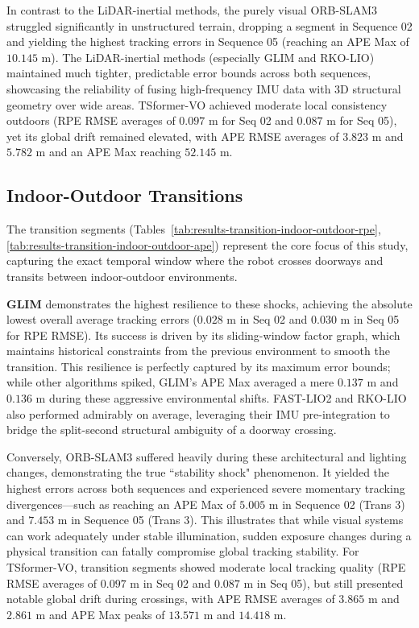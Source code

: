 \documentclass[pdflatex,sn-mathphys-num]{sn-jnl}
\theoremstyle{thmstyleone}%
\theoremstyle{thmstyletwo}%
\theoremstyle{thmstylethree}%
\begin{document}
In contrast to the LiDAR-inertial methods, the purely visual ORB-SLAM3 struggled significantly in unstructured terrain, dropping a segment in Sequence 02 and yielding the highest tracking errors in Sequence 05 (reaching an APE Max of $10.145$ m). The LiDAR-inertial methods (especially GLIM and RKO-LIO) maintained much tighter, predictable error bounds across both sequences, showcasing the reliability of fusing high-frequency IMU data with 3D structural geometry over wide areas. TSformer-VO achieved moderate local consistency outdoors (RPE RMSE averages of $0.097$ m for Seq 02 and $0.087$ m for Seq 05), yet its global drift remained elevated, with APE RMSE averages of $3.823$ m and $5.782$ m and an APE Max reaching $52.145$ m.

\subsection{Indoor-Outdoor Transitions}
The transition segments (Tables~\ref{tab:results-transition-indoor-outdoor-rpe}, \ref{tab:results-transition-indoor-outdoor-ape}) represent the core focus of this study, capturing the exact temporal window where the robot crosses doorways and transits between indoor-outdoor environments. 


\textbf{GLIM} demonstrates the highest resilience to these shocks, achieving the absolute lowest overall average tracking errors ($0.028$ m in Seq 02 and $0.030$ m in Seq 05 for RPE RMSE). Its success is driven by its sliding-window factor graph, which maintains historical constraints from the previous environment to smooth the transition. This resilience is perfectly captured by its maximum error bounds; while other algorithms spiked, GLIM's APE Max averaged a mere $0.137$ m and $0.136$ m during these aggressive environmental shifts. FAST-LIO2 and RKO-LIO also performed admirably on average, leveraging their IMU pre-integration to bridge the split-second structural ambiguity of a doorway crossing.

Conversely, ORB-SLAM3 suffered heavily during these architectural and lighting changes, demonstrating the true ``stability shock" phenomenon. It yielded the highest errors across both sequences and experienced severe momentary tracking divergences—such as reaching an APE Max of $5.005$ m in Sequence 02 (Trans 3) and $7.453$ m in Sequence 05 (Trans 3). This illustrates that while visual systems can work adequately under stable illumination, sudden exposure changes during a physical transition can fatally compromise global tracking stability. For TSformer-VO, transition segments showed moderate local tracking quality (RPE RMSE averages of $0.097$ m in Seq 02 and $0.087$ m in Seq 05), but still presented notable global drift during crossings, with APE RMSE averages of $3.865$ m and $2.861$ m and APE Max peaks of $13.571$ m and $14.418$ m.
\end{document}
